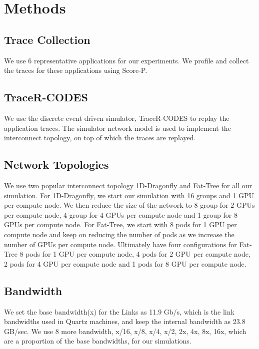 \documentclass[conference]{IEEEtran}
\begin{document}
\section{Methods}

\subsection{Trace Collection}

We use 6 representative applications for our experiments. We profile and collect the traces for these applications using Score-P\cite{b3}.

\subsection{TraceR-CODES}

We use the discrete event driven simulator, TraceR-CODES\cite{b4} to replay the application traces. The simulator network model is used to implement the interconnect topology, on top of which the traces are replayed.

\subsection{Network Topologies}

We use two popular interconnect topology 1D-Dragonfly and Fat-Tree for all our simulation\cite{b5}. For 1D-Dragonfly, we start our simulation with 16 groups and 1 GPU per compute node. We then reduce the size of the network to 8 group for 2 GPUs per compute node, 4 group for 4 GPUs per compute node and 1 group for 8 GPUs per compute node. For Fat-Tree, we start with 8 pods for 1 GPU per compute node  and keep on reducing the number of pods as we increase the number of GPUs per compute node. Ultimately have four configurations for Fat-Tree 8 pods for 1 GPU per compute node, 4 pods for 2 GPU per compute node, 2 pods for 4 GPU per compute node and 1 pods for 8 GPU per compute node.

\subsection{Bandwidth}

We set the base bandwidth(x) for the Links as 11.9 Gb/s, which is the link bandwidths used in Quartz machines, and keep the internal bandwidth as 23.8 GB/sec. We use 8 more bandwidth, x/16, x/8, x/4, x/2, 2x, 4x, 8x, 16x,  which are a proportion of the base bandwidths, for our simulations.
\end{document}
